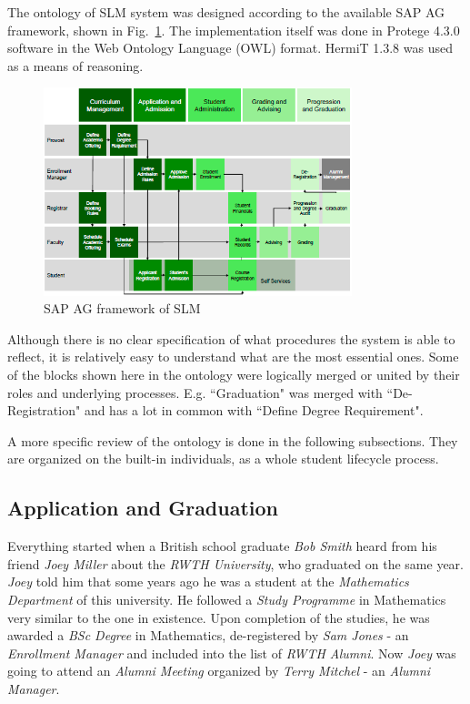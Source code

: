 \documentclass{article}    %
\begin{document}
The ontology of SLM system was designed according to the available SAP AG framework, shown in Fig.~\ref{SAP}. The implementation itself was done in Protege 4.3.0 software in the Web Ontology Language (OWL) format. HermiT 1.3.8 was used as a means of reasoning. 
\begin{figure}[htbp]
  \centering
    \includegraphics[width=0.8\textwidth]{Materials/Figures/1.png}
    \caption{SAP AG framework of SLM~\cite{sap}}
  \label{SAP}
\end{figure}

Although there is no clear specification of what procedures the system is able to reflect, it is relatively easy to understand what are the most essential ones. Some of the blocks shown here in the ontology were logically merged or united by their roles and underlying processes. E.g. ``Graduation" was merged with ``De-Registration" and has a lot in common with ``Define Degree Requirement". 

A more specific review of the ontology is done in the following subsections. They are organized on the built-in individuals, as a whole student lifecycle process.
%
\subsection{Application and Graduation}
%
Everything started when a British school graduate \textit{Bob Smith} heard from his friend \textit{Joey Miller} about the \textit{RWTH University}, who graduated on the same year. \textit{Joey} told him that some years ago he was a student at the \textit{Mathematics Department} of this university. He followed a \textit{Study Programme} in Mathematics very similar to the one in existence. Upon completion of the studies, he was awarded a \textit{BSc Degree} in Mathematics, de-registered by \textit{Sam Jones} - an \textit{Enrollment Manager} and included into the list of \textit{RWTH Alumni}. Now \textit{Joey} was going to attend an \textit{Alumni Meeting} organized by \textit{Terry Mitchel} - an \textit{Alumni Manager}.
\end{document}
